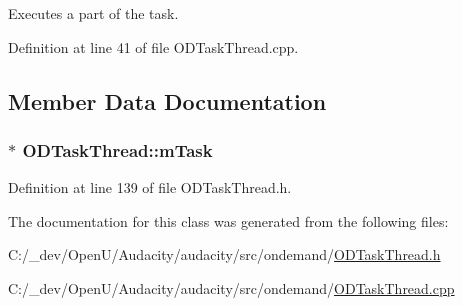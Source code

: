 Executes a part of the task. 



Definition at line 41 of file O\+D\+Task\+Thread.\+cpp.



\subsection{Member Data Documentation}
\subsubsection[{\texorpdfstring{m\+Task}{mTask}}]{$\ast$ O\+D\+Task\+Thread\+::m\+Task\hspace{0.3cm}{\ttfamily [protected]}}\hypertarget{class_o_d_task_thread_af9a2155158a622c318012731e9d17ec9}{}\label{class_o_d_task_thread_af9a2155158a622c318012731e9d17ec9}


Definition at line 139 of file O\+D\+Task\+Thread.\+h.



The documentation for this class was generated from the following files\+:\begin{DoxyCompactItemize}
\item 
C\+:/\+\_\+dev/\+Open\+U/\+Audacity/audacity/src/ondemand/\hyperlink{_o_d_task_thread_8h}{O\+D\+Task\+Thread.\+h}\item 
C\+:/\+\_\+dev/\+Open\+U/\+Audacity/audacity/src/ondemand/\hyperlink{_o_d_task_thread_8cpp}{O\+D\+Task\+Thread.\+cpp}\end{DoxyCompactItemize}
